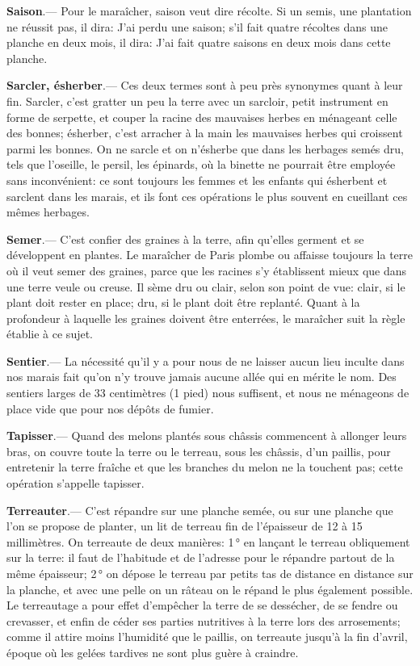 \documentclass[10pt,a4paper]{book}
\begin{document}
\textbf{Saison}.--- Pour le maraîcher, saison veut dire récolte. Si un semis, une plantation ne réussit pas, il dira: J'ai perdu une saison; s'il fait quatre récoltes dans une planche en deux mois, il dira: J'ai fait quatre saisons en deux mois dans cette planche.

\textbf{Sarcler, ésherber}.--- Ces deux termes sont à peu près synonymes quant à leur fin. Sarcler, c'est gratter un peu la terre avec un sarcloir, petit instrument en forme de serpette, et couper la racine des mauvaises herbes en ménageant celle des bonnes; ésherber, c'est arracher à la main les mauvaises herbes qui croissent parmi les bonnes. On ne sarcle et on n'ésherbe que dans les herbages semés dru, tels que l'oseille, le persil, les épinards, où la binette ne pourrait être employée sans inconvénient: ce sont toujours les femmes et les enfants qui ésherbent et sarclent dans les marais, et ils font ces opérations le plus souvent en cueillant ces mêmes herbages.

\textbf{Semer}.--- C'est confier des graines à la terre, afin qu'elles germent et se développent en plantes. Le maraîcher de Paris plombe ou affaisse toujours la terre où il veut semer des graines, parce que les racines s'y établissent mieux que dans une terre veule ou creuse. Il sème dru ou clair, selon son point de vue: clair, si le plant doit rester en place; dru, si le plant doit être replanté. Quant à la profondeur à laquelle les graines doivent être enterrées, le maraîcher suit la règle établie à ce sujet.

\textbf{Sentier}.--- La nécessité qu'il y a pour nous de ne laisser aucun lieu inculte dans nos marais fait qu'on n'y trouve jamais aucune allée qui en mérite le nom. Des sentiers larges de 33 centimètres (1 pied) nous suffisent, et nous ne ménageons de place vide que pour nos dépôts de fumier.

\textbf{Tapisser}.--- Quand des melons plantés sous châssis commencent à allonger leurs bras, on couvre toute la terre ou le terreau, sous les châssis, d'un paillis, pour entretenir la terre fraîche et que les branches du melon ne la touchent pas; cette opération s'appelle tapisser.

\textbf{Terreauter}.--- C'est répandre sur une planche semée, ou sur une planche que l'on se propose de planter, un lit de terreau fin de l'épaisseur de 12 à 15 millimètres. On terreaute de deux manières: 1\,° en lançant le terreau obliquement sur la terre: il faut de l'habitude et de l'adresse pour le répandre partout de la même épaisseur; 2\,° on dépose le terreau par petits tas de distance en distance sur la planche, et avec une pelle on un râteau on le répand le plus également possible. Le terreautage a pour effet d'empêcher la terre de se dessécher, de se fendre ou crevasser, et enfin de céder ses parties nutritives à la terre lors des arrosements; comme il attire moins l'humidité que le paillis, on terreaute jusqu'à la fin d'avril, époque où les gelées tardives ne sont plus guère à craindre.
\end{document}
